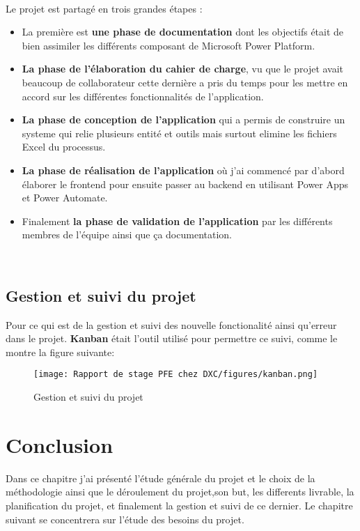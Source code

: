 \\
Le projet est partagé en trois grandes étapes : 
\\
\begin{itemize}
  \item La première est \textbf{une phase de documentation} dont les objectifs était de bien assimiler les différents composant de Microsoft Power Platform.
  \\
  \item \textbf{La phase de l'élaboration du cahier de charge}, vu que le projet avait beaucoup de collaborateur cette dernière a pris du temps pour les mettre en accord sur les différentes fonctionnalités de l'application.
  \\
  \item \textbf{La phase de conception de l'application} qui a permis de construire un systeme qui relie plusieurs entité et outils mais surtout elimine les fichiers Excel du processus.
  \\
  \item \textbf{La phase de réalisation de l'application} où j'ai commencé par d'abord élaborer le frontend pour ensuite passer au backend en utilisant Power Apps et Power Automate.
  \\
  \item Finalement \textbf{la phase de validation de l'application} par les différents membres de l'équipe ainsi que ça documentation.
  \\
\end{itemize}
\\

\subsection{Gestion et suivi du projet}
Pour ce qui est de la gestion et suivi des nouvelle fonctionalité ainsi qu'erreur dans le projet. \textbf{Kanban} était l'outil utilisé pour permettre ce suivi, comme le montre la figure suivante:

\begin{figure}[!h]
    \centering
    \texttt{[image: Rapport de stage PFE chez DXC/figures/kanban.png]}
    \caption{Gestion et suivi du projet}
\end{figure}


\section{Conclusion}

Dans ce chapitre j’ai présenté l’étude générale du projet et le choix de la méthodologie ainsi
que le déroulement du projet,son but, les differents livrable, la planification du projet, et finalement la gestion et suivi de ce dernier. Le chapitre suivant se concentrera sur l’étude des besoins du projet.
